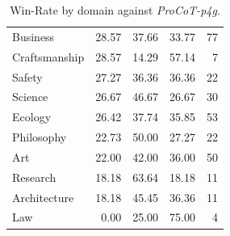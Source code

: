 \begin{table}[t]
\begin{tabular}{l rrrr}
        Business & 28.57 & 37.66 & 33.77 & 77 \\ 
        Craftsmanship & 28.57 & 14.29 & 57.14 & 7 \\ 
        Safety & 27.27 & 36.36 & 36.36 & 22 \\ 
        Science & 26.67 & 46.67 & 26.67 & 30 \\ 
        Ecology & 26.42 & 37.74 & 35.85 & 53 \\ 
        Philosophy & 22.73 & 50.00 & 27.27 & 22 \\ 
        Art & 22.00 & 42.00 & 36.00 & 50 \\ 
        Research & 18.18 & 63.64 & 18.18 & 11 \\ 
        Architecture & 18.18 & 45.45 & 36.36 & 11 \\ 
        Law & 0.00 & 25.00 & 75.00 & 4 \\  
        \bottomrule
    \end{tabular}
    \caption{Win-Rate by domain against \textit{ProCoT-p4g}.}
    \label{tab:result-daily-persuasion-per-domain-p4g}
\end{table}